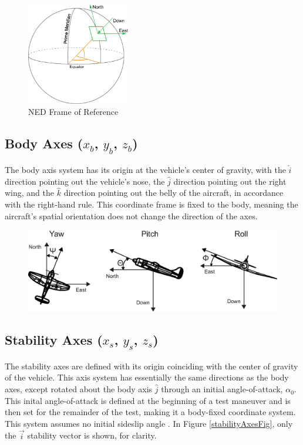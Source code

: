 \begin{figure}[h!]
\label{nedAxesFig}
  \centering
    \includegraphics[width=0.4\textwidth]{figures/nedAxes.eps}
      \caption{NED Frame of Reference\cite{nedAxes}} 
\end{figure}

\subsection*{Body Axes ($x_b$, $y_b$, $z_b$)}
The body axis system has its origin at the vehicle's center of gravity, with the $\hat{i}$ direction pointing out the vehicle's nose, the $\hat{j}$ direction pointing out the right wing, and the $\hat{k}$ direction pointing out the belly of the aircraft, in accordance with the right-hand rule. This coordinate frame is fixed to the body, meaning the aircraft's spatial orientation does not change the direction of the axes.
\begin{figure}[H]
  \centering
  \includegraphics[width=.9\linewidth]{figures/bodyAxes.eps}
  \label{bodyAxesFig}
\end{figure}

\subsection*{Stability Axes ($x_s$, $y_s$, $z_s$)}
The stability axes are defined with its origin coinciding with the center of gravity of the vehicle. This axis system has essentially the same directions as the body axes, except rotated about the body axis $\hat{j}$ through an initial angle-of-attack, $\alpha_{0}$. This inital angle-of-attack is defined at the beginning of a test maneuver and is then set for the remainder of the test, making it a body-fixed coordinate system. This system assumes no initial sideslip angle \cite{roskam2001airplane}. In Figure \ref{stabilityAxesFig}, only the $\vec{i}$ stability vector is shown, for clarity.

